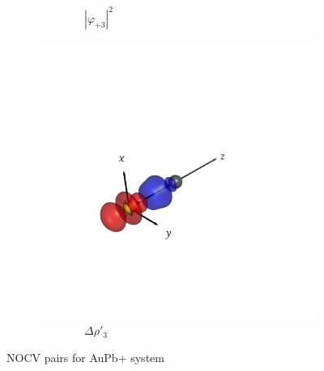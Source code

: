 \documentclass[journal=inoraj,manuscript=article]{achemso}
\begin{document}
\begin{figure}[!h]
\begin{subfigure}[t]{0.32\textwidth}
        \caption*{\ \ \ \ \ \ \ \ $|\varphi_{+3}|^2$} 
    \end{subfigure}
    \hfill
    \begin{subfigure}[t]{0.32\textwidth}
        \centering
        \includegraphics[width=\linewidth]{./AuPb+/pair5.png} 
        \caption*{\ \ \ \ \ \ \ \ $\Delta \rho'_3$} 
    \end{subfigure}

\caption{NOCV pairs for AuPb+ system}
\end{figure}
\end{document}
